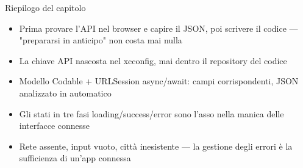 \begin{tcbsummary}{Riepilogo del capitolo}
\begin{itemize}
  \item Prima provare l'API nel browser e capire il JSON, poi scrivere il codice — "prepararsi in anticipo" non costa mai nulla
  \item La chiave API nascosta nel xcconfig, mai dentro il repository del codice
  \item Modello Codable + URLSession async/await: campi corrispondenti, JSON analizzato in automatico
  \item Gli stati in tre fasi loading/success/error sono l'asso nella manica delle interfacce connesse
  \item Rete assente, input vuoto, città inesistente — la gestione degli errori è la sufficienza di un'app connessa
\end{itemize}

\end{tcbsummary}
